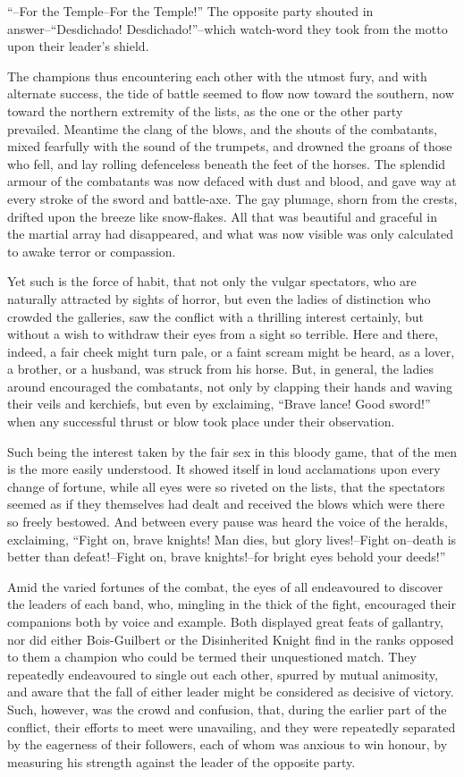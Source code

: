 ``--For the Temple--For the Temple!'' The opposite party shouted in
answer--``Desdichado! Desdichado!''--which watch-word they took from the
motto upon their leader's shield.

The champions thus encountering each other with the utmost fury, and
with alternate success, the tide of battle seemed to flow now toward the
southern, now toward the northern extremity of the lists, as the one or
the other party prevailed. Meantime the clang of the blows, and the
shouts of the combatants, mixed fearfully with the sound of the
trumpets, and drowned the groans of those who fell, and lay rolling
defenceless beneath the feet of the horses. The splendid armour of the
combatants was now defaced with dust and blood, and gave way at every
stroke of the sword and battle-axe. The gay plumage, shorn from the
crests, drifted upon the breeze like snow-flakes. All that was beautiful
and graceful in the martial array had disappeared, and what was now
visible was only calculated to awake terror or compassion.

Yet such is the force of habit, that not only the vulgar spectators, who
are naturally attracted by sights of horror, but even the ladies of
distinction who crowded the galleries, saw the conflict with a thrilling
interest certainly, but without a wish to withdraw their eyes from a
sight so terrible. Here and there, indeed, a fair cheek might turn pale,
or a faint scream might be heard, as a lover, a brother, or a husband,
was struck from his horse. But, in general, the ladies around encouraged
the combatants, not only by clapping their hands and waving their veils
and kerchiefs, but even by exclaiming, ``Brave lance! Good sword!'' when
any successful thrust or blow took place under their observation.

Such being the interest taken by the fair sex in this bloody game, that
of the men is the more easily understood. It showed itself in loud
acclamations upon every change of fortune, while all eyes were so
riveted on the lists, that the spectators seemed as if they themselves
had dealt and received the blows which were there so freely bestowed.
And between every pause was heard the voice of the heralds, exclaiming,
``Fight on, brave knights! Man dies, but glory lives!--Fight on--death
is better than defeat!--Fight on, brave knights!--for bright eyes behold
your deeds!''

Amid the varied fortunes of the combat, the eyes of all endeavoured to
discover the leaders of each band, who, mingling in the thick of the
fight, encouraged their companions both by voice and example. Both
displayed great feats of gallantry, nor did either Bois-Guilbert or the
Disinherited Knight find in the ranks opposed to them a champion who
could be termed their unquestioned match. They repeatedly endeavoured to
single out each other, spurred by mutual animosity, and aware that the
fall of either leader might be considered as decisive of victory. Such,
however, was the crowd and confusion, that, during the earlier part of
the conflict, their efforts to meet were unavailing, and they were
repeatedly separated by the eagerness of their followers, each of whom
was anxious to win honour, by measuring his strength against the leader
of the opposite party.

